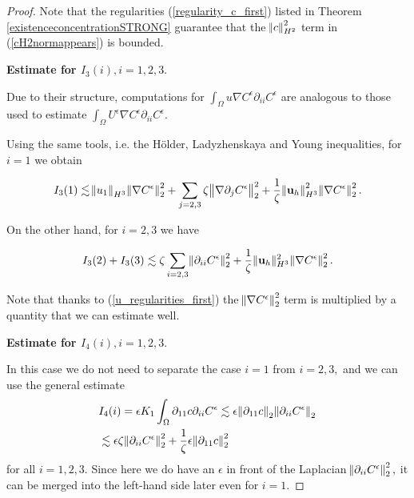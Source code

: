\documentclass[12pt]{report}
\numberwithin{theorem}{chapter}
\numberwithin{corollary}{chapter}
\numberwithin{lemma}{chapter}
\numberwithin{remark}{chapter}
\numberwithin{definition}{chapter}
\numberwithin{prop}{chapter}
\begin{document}
\begin{proof}
Note that the regularities (\ref{regularity_c_first}) listed in Theorem \ref{existenceconcentrationSTRONG} guarantee that the $\norm{c}_{H^2}^2$ term in (\ref{cH2normappears}) is bounded.

\bigskip

\textbf{Estimate for $I_3(i), i=1,2,3.$}

Due to their structure, computations for $\int_\Omega u \nabla C^\epsilon \partial_{ii} C^\epsilon$ are analogous to those used to estimate $ \int_\Omega U^\epsilon \nabla C^\epsilon \partial_{ii} C^\epsilon.$

Using the same tools, i.e. the H\"older, Ladyzhenskaya and Young inequalities, for $i=1$ we obtain

\begin{equation}
    I_3(1) \lesssim \norm{u_1}_{H^3} \norm{\nabla C^\epsilon}_2^2 + \sum_{j=2,3} \zeta \norm{\nabla \partial_j C^\epsilon}_2^2 + \frac{1}{\zeta} \norm{\mathbf{u}_h}_{H^3}^2 \norm{\nabla C^\epsilon}_2^2.
\end{equation}

On the other hand, for $i = 2,3$ we have

\begin{equation}
  I_3(2) + I_3(3) \lesssim \zeta \sum_{i=2,3} \norm{\partial_{ii} C^\epsilon}_2^2 + \frac{1}{\zeta} \| \mathbf{u}_h \| _ {H^3} ^ 2 \norm{\nabla C^\epsilon}_2^2.
\end{equation}

Note that thanks to (\ref{u_regularities_first}) the $\norm{\nabla C^\epsilon}_2^2$ term is multiplied by a quantity that we can estimate well.

\bigskip

\textbf{Estimate for $I_4(i), i = 1,2,3.$}

In this case we do not need to separate the case $i=1$ from $i=2,3,$ and we can use the general estimate
%
\begin{equation}
  \begin{split}
    & I_4(i) = \epsilon K_1 \int_\Omega \partial_{11} c \partial_{ii} C^\epsilon \lesssim \epsilon \norm{\partial_{11} c}_2 \norm{\partial_{ii} C^\epsilon}_2 \\
    & \lesssim \epsilon \zeta \norm{\partial_{ii} C^\epsilon}_2^2 + \frac{1}{\zeta}\epsilon \norm{\partial_{11} c}_2^2
  \end{split}
\end{equation}
%
for all $i =1,2,3.$ Since here we do have an $\epsilon$ in front of the Laplacian $ \norm{\partial_{ii} C^\epsilon}_2^2,$ it can be merged into the left-hand side later even for $i = 1.$


\end{proof}
\end{document}
